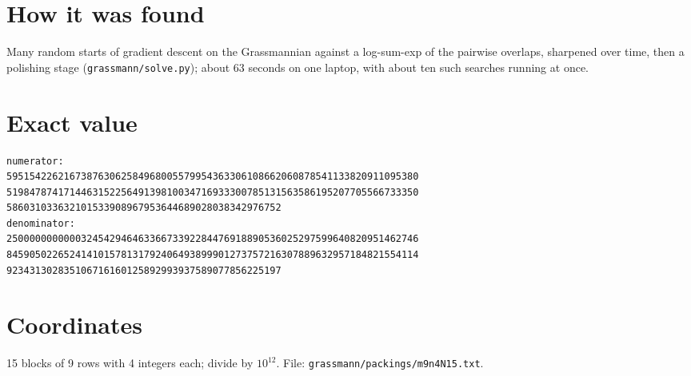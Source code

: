 \documentclass[11pt,a4paper]{article}
\begin{document}
\section{How it was found}
Many random starts of gradient descent on the Grassmannian against a log-sum-exp of the pairwise overlaps, sharpened over time, then a polishing stage (\texttt{grassmann/solve.py}); about 63 seconds on one laptop, with about ten such searches running at once.


\appendix
\section{Exact value}
{\small
\begin{verbatim}
numerator:
595154226216738763062584968005579954363306108662060878541133820911095380
519847874171446315225649139810034716933300785131563586195207705566733350
586031033632101533908967953644689028038342976752
denominator:
250000000000032454294646336673392284476918890536025297599640820951462746
845905022652414101578131792406493899901273757216307889632957184821554114
923431302835106716160125892993937589077856225197
\end{verbatim}}

\section{Coordinates}
15 blocks of 9 rows with 4 integers each; divide by $10^{12}$. File: \texttt{grassmann/packings/m9n4N15.txt}.
{\tiny
\begin{multicols}{3}
\end{multicols}}
\end{document}
